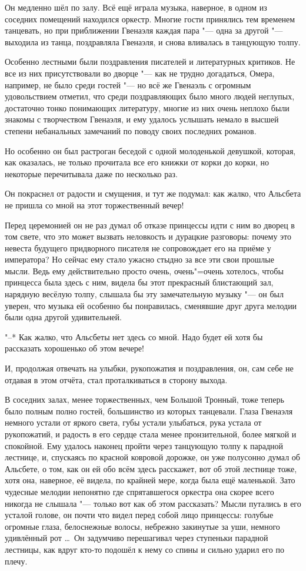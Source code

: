 Он медленно шёл по залу.
Всё ещё играла музыка, наверное, в одном из соседних помещений находился
оркестр.
Многие гости принялись тем временем танцевать, но при приближении Гвенаэля
каждая пара "--- одна за другой "--- выходила из танца, поздравляла Гвенаэля, и
снова вливалась в танцующую толпу.

Особенно лестными были поздравления писателей и литературных критиков.
Не все из них присутствовали во дворце "--- как не трудно догадаться, Омера,
например, не было среди гостей "--- но всё же Гвенаэль с огромным удовольствием
отметил, что среди поздравляющих было много людей неглупых, достаточно тонко
понимающих литературу, многие из них очень неплохо были знакомы с творчеством
Гвенаэля, и ему удалось услышать немало в высшей степени небанальных замечаний
по поводу своих последних романов.

Но особенно он был растроган беседой с одной молоденькой девушкой, которая, как
оказалась, не только прочитала все его книжки от корки до корки, но некоторые
перечитывала даже по несколько раз.

Он покраснел от радости и смущения, и тут же подумал: как жалко, что Альсбета не
пришла со мной на этот торжественный вечер!

Перед церемонией он не раз думал об отказе принцессы идти с ним во дворец в том
свете, что это может вызвать неловкость и дурацкие разговоры: почему это невеста
будущего придворного писателя не сопровождает его на приёме у императора?
Но сейчас ему стало ужасно стыдно за все эти свои прошлые мысли.
Ведь ему действительно просто очень, очень"=очень хотелось, чтобы принцесса была
здесь с ним, видела бы этот прекрасный блистающий зал, нарядную весёлую толпу,
слышала бы эту замечательную музыку "--- он был уверен, что музыка ей особенно
бы понравилась, сменявшие друг друга мелодии были одна другой удивительней.

"--* Как жалко, что Альсбеты нет здесь со мной.
Надо будет ей хотя бы рассказать хорошенько об этом вечере!

И, продолжая отвечать на улыбки, рукопожатия и поздравления, он, сам себе не
отдавая в этом отчёта, стал проталкиваться в сторону выхода.

В соседних залах, менее торжественных, чем Большой Тронный, тоже теперь было
полным полно гостей, большинство из которых танцевали.
Глаза Гвенаэля немного устали от яркого света, губы устали улыбаться, рука
устала от рукопожатий, и радость в его сердце стала менее пронзительной, более
мягкой и спокойной.
Ему удалось наконец пройти через танцующую толпу к парадной лестнице, и,
спускаясь по красной ковровой дорожке, он уже полусонно думал об Альсбете, о
том, как он ей обо всём здесь расскажет, вот об этой лестнице тоже, хотя она,
наверное, её видела, по крайней мере, когда была ещё маленькой.
Зато чудесные мелодии непонятно где спрятавшегося оркестра она скорее всего
никогда не слышала "--- только вот как об этом рассказать?
Мысли путались в его усталой голове, он почти что видел перед собой лицо
принцессы: голубые огромные глаза, белоснежные волосы, небрежно закинутые за
уши, немного удивлённый рот \ldots\
Он задумчиво перешагивал через ступеньки парадной лестницы, как вдруг кто-то
подошёл к нему со спины и сильно ударил его по плечу.

